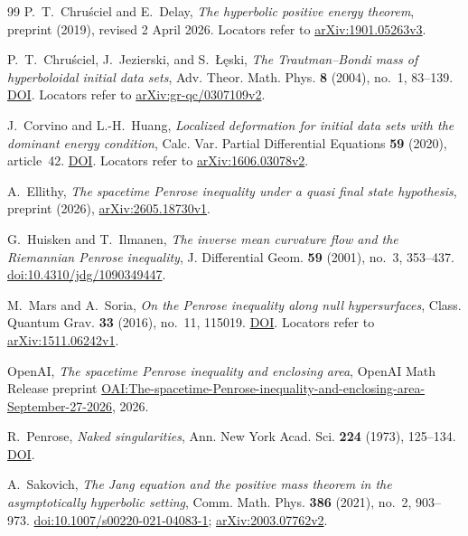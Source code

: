 \begin{thebibliography}{99}
P.~T.~Chru\'sciel and E.~Delay,
\emph{The hyperbolic positive energy theorem},
preprint (2019), revised 2 April 2026.
Locators refer to
\href{https://arxiv.org/abs/1901.05263v3}{arXiv:1901.05263v3}.

P.~T.~Chru\'sciel, J.~Jezierski, and S.~\L{}\k{e}ski,
\emph{The Trautman--Bondi mass of hyperboloidal initial data sets},
Adv. Theor. Math. Phys. \textbf{8} (2004), no.~1, 83--139.
\href{https://doi.org/10.4310/ATMP.2004.v8.n1.a2}{DOI}.
Locators refer to
\href{https://arxiv.org/abs/gr-qc/0307109v2}{arXiv:gr-qc/0307109v2}.

J.~Corvino and L.-H.~Huang,
\emph{Localized deformation for initial data sets with the dominant energy condition},
Calc. Var. Partial Differential Equations \textbf{59} (2020), article~42.
\href{https://doi.org/10.1007/s00526-019-1679-9}{DOI}.
Locators refer to
\href{https://arxiv.org/abs/1606.03078v2}{arXiv:1606.03078v2}.

A.~Ellithy,
\emph{The spacetime Penrose inequality under a quasi final state hypothesis},
preprint (2026),
\href{https://arxiv.org/abs/2605.18730v1}{arXiv:2605.18730v1}.

G.~Huisken and T.~Ilmanen,
\emph{The inverse mean curvature flow and the Riemannian Penrose inequality},
J. Differential Geom. \textbf{59} (2001), no.~3, 353--437.
\href{https://doi.org/10.4310/jdg/1090349447}{doi:10.4310/jdg/1090349447}.

M.~Mars and A.~Soria,
\emph{On the Penrose inequality along null hypersurfaces},
Class. Quantum Grav. \textbf{33} (2016), no.~11, 115019.
\href{https://doi.org/10.1088/0264-9381/33/11/115019}{DOI}.
Locators refer to
\href{https://arxiv.org/abs/1511.06242v1}{arXiv:1511.06242v1}.

OpenAI,
\emph{The spacetime Penrose inequality and enclosing area},
OpenAI Math Release preprint
\href{https://github.com/openai/math/blob/main/preprints/The-spacetime-Penrose-inequality-and-enclosing-area-September-27-2026/paper.pdf}{OAI:The-spacetime-Penrose-inequality-and-enclosing-area-September-27-2026},
2026.

R.~Penrose,
\emph{Naked singularities},
Ann. New York Acad. Sci. \textbf{224} (1973), 125--134.
\href{https://doi.org/10.1111/j.1749-6632.1973.tb41447.x}{DOI}.

A.~Sakovich,
\emph{The Jang equation and the positive mass theorem in the asymptotically hyperbolic setting},
Comm. Math. Phys. \textbf{386} (2021), no.~2, 903--973.
\href{https://doi.org/10.1007/s00220-021-04083-1}{doi:10.1007/s00220-021-04083-1};
\href{https://arxiv.org/abs/2003.07762v2}{arXiv:2003.07762v2}.

\end{thebibliography}
